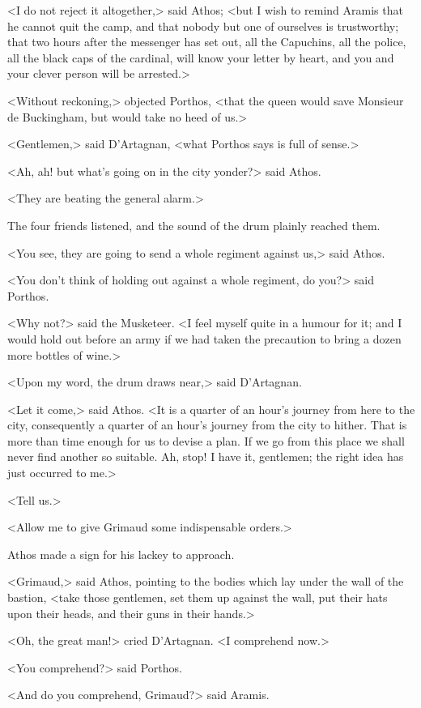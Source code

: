 <I do not reject it altogether,> said Athos; <but I wish to remind Aramis that he cannot quit the camp, and that nobody but one of ourselves is trustworthy; that two hours after the messenger has set out, all the Capuchins, all the police, all the black caps of the cardinal, will know your letter by heart, and you and your clever person will be arrested.> 

<Without reckoning,> objected Porthos, <that the queen would save Monsieur de Buckingham, but would take no heed of us.> 

<Gentlemen,> said D'Artagnan, <what Porthos says is full of sense.> 

<Ah, ah! but what's going on in the city yonder?> said Athos. 

<They are beating the general alarm.> 

The four friends listened, and the sound of the drum plainly reached them. 

<You see, they are going to send a whole regiment against us,> said Athos. 

<You don't think of holding out against a whole regiment, do you?> said Porthos. 

<Why not?> said the Musketeer. <I feel myself quite in a humour for it; and I would hold out before an army if we had taken the precaution to bring a dozen more bottles of wine.> 

<Upon my word, the drum draws near,> said D'Artagnan. 

<Let it come,> said Athos. <It is a quarter of an hour's journey from here to the city, consequently a quarter of an hour's journey from the city to hither. That is more than time enough for us to devise a plan. If we go from this place we shall never find another so suitable. Ah, stop! I have it, gentlemen; the right idea has just occurred to me.> 

<Tell us.> 

<Allow me to give Grimaud some indispensable orders.> 

Athos made a sign for his lackey to approach. 

<Grimaud,> said Athos, pointing to the bodies which lay under the wall of the bastion, <take those gentlemen, set them up against the wall, put their hats upon their heads, and their guns in their hands.> 

<Oh, the great man!> cried D'Artagnan. <I comprehend now.> 

<You comprehend?> said Porthos. 

<And do you comprehend, Grimaud?> said Aramis. 

